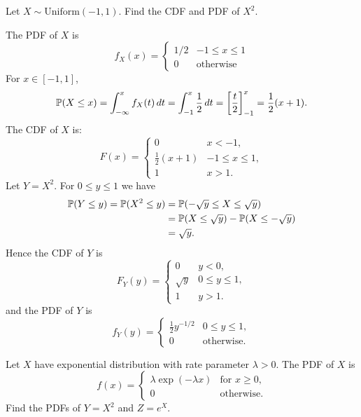 \begin{exercise}
\begin{questions}
\question
Let $X\sim\text{Uniform}(-1,1)$. Find the CDF and PDF of $X^2$.


\begin{answer}
The PDF of $X$ is 
\[
f_X(x) = \left\{\begin{array}{ll}
	1/2	& -1\leq x\leq 1 \\
	0	& \text{otherwise}
\end{array}\right.	
\]	
For $x\in[-1,1]$, 
\[
\mathbb{P}(X\leq x) 
	= \int_{-\infty}^x f_X(t)\,dt
	= \int_{-1}^x \frac{1}{2}\,dt
	= \left[\frac{t}{2}\right]_{-1}^x
	= \frac{1}{2}(x+1).
\]
The CDF of $X$ is:
\[
F(x) = \left\{\begin{array}{ll}
	0				 	& x < -1, \\
	\frac{1}{2}(x+1) 	& -1\leq x\leq 1, \\
	1					& x > 1.
\end{array}\right.	
\]
Let $Y=X^2$. For $0\leq y\leq 1$ we have
\begin{align*}
\mathbb{P}(Y\leq y)
	= \mathbb{P}(X^2\leq y)
	& = \mathbb{P}(-\sqrt{y}\leq X\leq\sqrt{y}) \\
	& = \mathbb{P}(X\leq\sqrt{y}) - \mathbb{P}(X\leq-\sqrt{y}) \\
	& = \sqrt{y}.
\end{align*}
Hence the CDF of $Y$ is
\[
F_Y(y) = \left\{\begin{array}{ll}
	0		 	& y < 0, \\
	\sqrt{y} 	& 0\leq y\leq 1, \\
	1			& y > 1.
\end{array}\right.	
\]
and the PDF of $Y$ is
\[
f_Y(y) = \left\{\begin{array}{ll}
\frac{1}{2}y^{-1/2}	& 0\leq y\leq 1, \\
0					& \text{otherwise}.
\end{array}\right.	
\]
\end{answer}

\question
Let $X$ have exponential distribution with rate parameter $\lambda>0$. The PDF of $X$ is
\[
f(x) = \left\{\begin{array}{ll}
	\lambda\exp(-\lambda x)	& \text{for } x \geq 0, \\
	0						& \text{otherwise.}
\end{array}\right.
\]
Find the PDFs of $Y=X^2$ and $Z=e^X$.


\end{questions}
\end{exercise}
